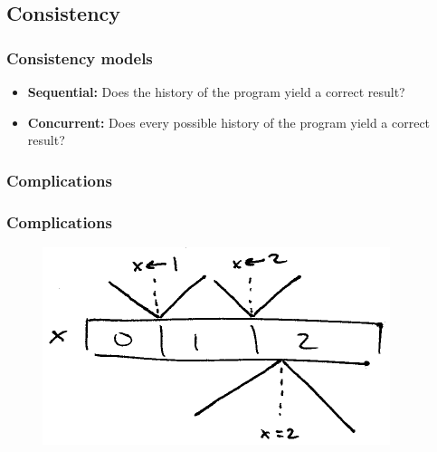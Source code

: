\documentclass{beamer}
\begin{document}
  \subsection{Consistency}

  \begin{frame}
    \frametitle{Consistency models}

    \begin{itemize}
      \item \textbf{Sequential:} Does the history of the program yield a correct result?
      \item \textbf{Concurrent:} Does every possible history of the program yield a correct result?
    \end{itemize}
  \end{frame}

  \begin{frame}
    \frametitle{Complications}


  \end{frame}

  \begin{frame}
    \frametitle{Complications}

    \begin{figure}
      \centering
      \includegraphics{noninstantaneity}
    \end{figure}
  \end{frame}
\end{document}
